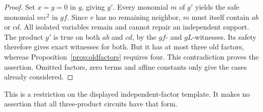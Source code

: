 \documentclass[11pt]{article}
\theoremstyle{definition}
\theoremstyle{remark}
\begin{document}
\begin{proof}
Set $x=y=0$ in $g$, giving $g'$. Every monomial $m$ of $g'$ yields the safe monomial $mv^2$ in $gf$. Since $v$ has no remaining neighbor, $m$ must itself contain $ab$ or $cd$. All isolated variables remain and cannot repair an independent support. The product $g'$ is true on both $ab$ and $cd$, by the $gf$- and $gL$-witnesses. Its safety therefore gives exact witnesses for both. But it has at most three old factors, whereas Proposition~\ref{prop:oldfactors} requires four. This contradiction proves the assertion. Omitted factors, zero terms and affine constants only give the cases already considered.
\end{proof}

This is a restriction on the displayed independent-factor template. It makes no assertion that all three-product circuits have that form.
\end{document}
